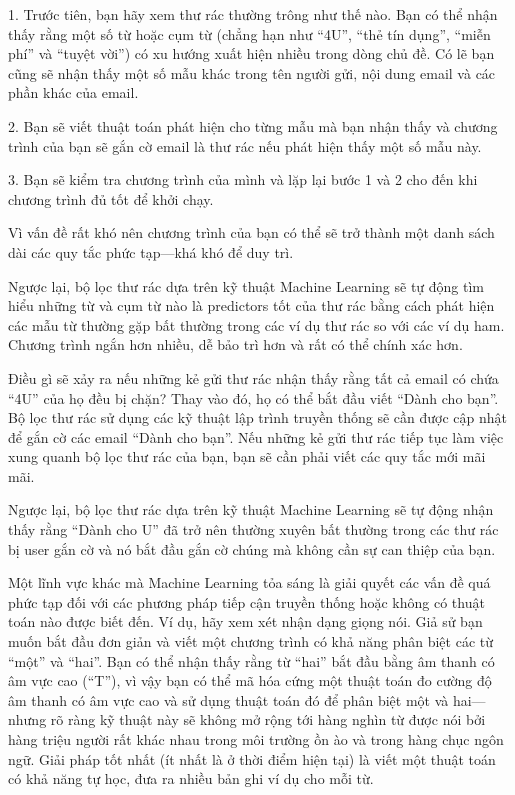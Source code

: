 1. Trước tiên, bạn hãy xem thư rác thường trông như thế nào. Bạn có thể nhận thấy rằng một số từ hoặc cụm từ (chẳng hạn như “4U”, “thẻ tín dụng”, “miễn phí” và “tuyệt vời”) có xu hướng xuất hiện nhiều trong dòng chủ đề. Có lẽ bạn cũng sẽ nhận thấy một số mẫu khác trong tên người gửi, nội dung email và các phần khác của email.

2. Bạn sẽ viết thuật toán phát hiện cho từng mẫu mà bạn nhận thấy và chương trình của bạn sẽ gắn cờ email là thư rác nếu phát hiện thấy một số mẫu này.

3. Bạn sẽ kiểm tra chương trình của mình và lặp lại bước 1 và 2 cho đến khi chương trình đủ tốt để khởi chạy.

Vì vấn đề rất khó nên chương trình của bạn có thể sẽ trở thành một danh sách dài các quy tắc phức tạp—khá khó để duy trì.

Ngược lại, bộ lọc thư rác dựa trên kỹ thuật Machine Learning sẽ tự động tìm hiểu những từ và cụm từ nào là predictors tốt của thư rác bằng cách phát hiện các mẫu từ thường gặp bất thường trong các ví dụ thư rác so với các ví dụ ham. Chương trình ngắn hơn nhiều, dễ bảo trì hơn và rất có thể chính xác hơn.

Điều gì sẽ xảy ra nếu những kẻ gửi thư rác nhận thấy rằng tất cả email có chứa “4U” của họ đều bị chặn? Thay vào đó, họ có thể bắt đầu viết “Dành cho bạn”. Bộ lọc thư rác sử dụng các kỹ thuật lập trình truyền thống sẽ cần được cập nhật để gắn cờ các email “Dành cho bạn”. Nếu những kẻ gửi thư rác tiếp tục làm việc xung quanh bộ lọc thư rác của bạn, bạn sẽ cần phải viết các quy tắc mới mãi mãi.

Ngược lại, bộ lọc thư rác dựa trên kỹ thuật Machine Learning sẽ tự động nhận thấy rằng “Dành cho U” đã trở nên thường xuyên bất thường trong các thư rác bị user gắn cờ và nó bắt đầu gắn cờ chúng mà không cần sự can thiệp của bạn.

Một lĩnh vực khác mà Machine Learning tỏa sáng là giải quyết các vấn đề quá phức tạp đối với các phương pháp tiếp cận truyền thống hoặc không có thuật toán nào được biết đến. Ví dụ, hãy xem xét nhận dạng giọng nói. Giả sử bạn muốn bắt đầu đơn giản và viết một chương trình có khả năng phân biệt các từ “một” và “hai”. Bạn có thể nhận thấy rằng từ “hai” bắt đầu bằng âm thanh có âm vực cao (“T”), vì vậy bạn có thể mã hóa cứng một thuật toán đo cường độ âm thanh có âm vực cao và sử dụng thuật toán đó để phân biệt một và hai—nhưng rõ ràng kỹ thuật này sẽ không mở rộng tới hàng nghìn từ được nói bởi hàng triệu người rất khác nhau trong môi trường ồn ào và trong hàng chục ngôn ngữ. Giải pháp tốt nhất (ít nhất là ở thời điểm hiện tại) là viết một thuật toán có khả năng tự học, đưa ra nhiều bản ghi ví dụ cho mỗi từ.

